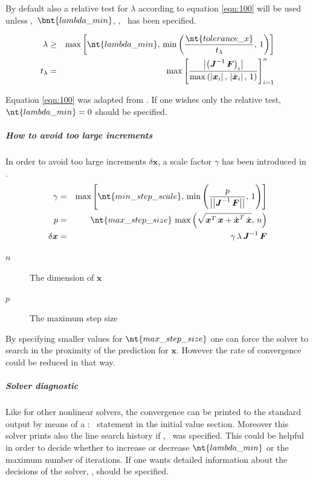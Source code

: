 By default also a relative test for $\lambda$ according to equation \ref{eqn:100} will be used unless ,~$\bnt{lambda\_min}$, ,~ has been specified.

\begin{eqnarray}
\label{eqn:100}
\lambda &\geq& \max{\left[\nt{lambda\_min},\,\min{\left(\frac{\nt{tolerance\_x}}{t_{\lambda}},\,1\right)}\right]} \\ \nonumber
t_{\lambda}&=&\max{\left[\frac{\left|\left(\boldsymbol{J}^{-1}\,\boldsymbol{F}\right)_{i}\right|}{\max{\left(\left|\boldsymbol{x}_i\right|,\, \left|\dot{\boldsymbol{x}}_i\right|,\, 1\right)}}\right]}_{i=1}^{n}
\end{eqnarray}

Equation \ref{eqn:100} was adapted from \cite{NUMERICAL-RECIPES-IN-C}.
If one wishes only the relative test, $\nt{lambda\_min}=0$ should be specified.

\subparagraph{How to avoid too large increments}
In order to avoid too large increments $\delta\boldsymbol{x}$, a scale factor $\gamma$ has been introduced in \cite{NUMERICAL-RECIPES-IN-C}.
\begin{eqnarray}
\gamma &=& \max{\left[\nt{min\_step\_scale}, \, \min{\left(\frac{p}{\left|\left| \boldsymbol{J}^{-1} \, \boldsymbol{F} \right|\right|},\, 1\right)}\right]} \\ \nonumber
p &=& \nt{max\_step\_size} \, \max{\left(\sqrt{\boldsymbol{x}^T\,\boldsymbol{x} + \dot{\boldsymbol{x}}^T\,\dot{\boldsymbol{x}}},\, n\right)} \\ \nonumber
\delta\boldsymbol{x}&=&\gamma\,\lambda\,\boldsymbol{J}^{-1}\,\boldsymbol{F}
\end{eqnarray}

\begin{description}
\item[$n$] The dimension of $\boldsymbol{x}$
\item[$p$] The maximum step size
\end{description}

By specifying smaller values for $\nt{max\_step\_size}$ one can force the solver to search in the proximity of the prediction for $\boldsymbol{x}$. However the rate of convergence could be reduced in that way.

\subparagraph{Solver diagnostic}
Like for other nonlinear solvers, the convergence can be printed to the standard output by means of a :~ statement in the initial value section. Moreover this solver prints also the line search history if ,~ was specified. This could be helpful in order to decide whether to increase or decrease $\nt{lambda\_min}$ or the maximum number of iterations. If one wants detailed information about the decisions of the solver, ,  should be specified.

